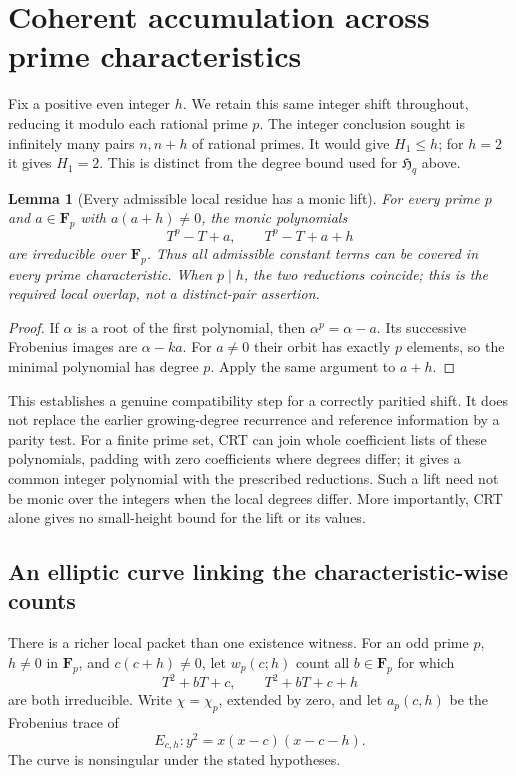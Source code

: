 \documentclass[11pt]{article}
\newtheorem{lemma}[theorem]{Lemma}
\newcommand{\F}{\mathbf F}
\begin{document}
\section{Coherent accumulation across prime characteristics}
Fix a positive even integer \(h\). We retain this same integer shift
throughout, reducing it modulo each rational prime \(p\).
The integer conclusion sought is infinitely many pairs \(n,n+h\)
of rational primes. It would give \(H_1\leq h\); for \(h=2\) it gives
\(H_1=2\). This is distinct from the degree bound used for
\({\mathfrak H}_q\) above.

\begin{lemma}[Every admissible local residue has a monic lift]
\label{lem:artinSchreierCoverage}
For every prime \(p\) and \(a\in\F_p\) with \(a(a+h)\ne0\),
the monic polynomials
\[
                 T^p-T+a,\qquad T^p-T+a+h
\]
are irreducible over \(\F_p\).
Thus all admissible constant terms can be covered in every prime
characteristic. When \(p\mid h\), the two reductions coincide;
this is the required local overlap, not a distinct-pair assertion.
\end{lemma}
\begin{proof}
If \(\alpha\) is a root of the first polynomial, then
\(\alpha^p=\alpha-a\). Its successive Frobenius images are
\(\alpha-ka\). For \(a\ne0\) their orbit has exactly \(p\) elements,
so the minimal polynomial has degree \(p\).
Apply the same argument to \(a+h\).
\end{proof}

This establishes a genuine compatibility step for a correctly
paritied shift. It does not replace the earlier growing-degree
recurrence and reference information by a parity test.
For a finite prime set, CRT can join whole coefficient lists of
these polynomials, padding with zero coefficients where degrees
differ; it gives a common integer polynomial with the prescribed
reductions. Such a lift need not be monic over the integers when
the local degrees differ. More importantly, CRT alone gives no
small-height bound for the lift or its values.

\subsection{An elliptic curve linking the characteristic-wise counts}
There is a richer local packet than one existence witness.
For an odd prime \(p\), \(h\ne0\) in \(\F_p\), and
\(c(c+h)\ne0\), let \(w_p(c;h)\) count all \(b\in\F_p\) for which
\[
                 T^2+bT+c,\qquad T^2+bT+c+h
\]
are both irreducible. Write \(\chi=\chi_p\), extended by zero,
and let \(a_p(c,h)\) be the Frobenius trace of
\[
                       E_{c,h}:y^2=x(x-c)(x-c-h).
\]
The curve is nonsingular under the stated hypotheses.
\end{document}
